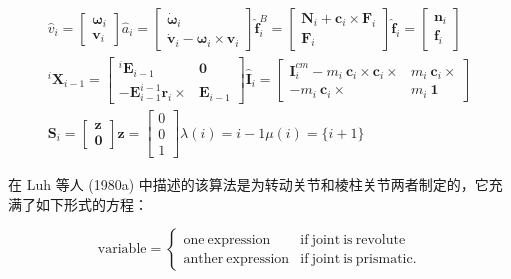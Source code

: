 \documentclass[10pt,a4paper]{book}
\theoremstyle{thmstyle} %
\theoremstyle{defstyle} %
\theoremstyle{prostyle} %
\begin{document}
$$
\begin{gathered}\hat{v}_i=\begin{bmatrix}\boldsymbol{\omega}_i\\\boldsymbol{v}_i\end{bmatrix}\hat{a}_i=\begin{bmatrix}\dot{\boldsymbol{\omega}}_i\\\dot{\boldsymbol{v}}_i-\boldsymbol{\omega}_i\times\boldsymbol{v}_i\end{bmatrix}\hat{\boldsymbol{f}}_i^B=\begin{bmatrix}\boldsymbol{N}_i+\boldsymbol{c}_i\times\boldsymbol{F}_i\\\boldsymbol{F}_i\end{bmatrix}\hat{\boldsymbol{f}}_i=\begin{bmatrix}\boldsymbol{n}_i\\\boldsymbol{f}_i\end{bmatrix}\\^i\boldsymbol{X}_{i-1}=\begin{bmatrix}{}^i\boldsymbol{E}_{i-1}&\mathbf{0}\\-\boldsymbol{E}_{i-1}^{i-1}\boldsymbol{r}_i\times&\boldsymbol{E}_{i-1}\end{bmatrix}\hat{\boldsymbol{I}}_i=\begin{bmatrix}\boldsymbol{I}_i^{cm}-m_i\:\boldsymbol{c}_i\times\boldsymbol{c}_i\times&m_i\:\boldsymbol{c}_i\times\\-m_i\:\boldsymbol{c}_i\times&m_i\:\boldsymbol{1}\end{bmatrix}\\\boldsymbol{S}_i=\begin{bmatrix}\boldsymbol{z}\\\boldsymbol{0}\end{bmatrix}\boldsymbol{z}=\begin{bmatrix}0\\0\\1\end{bmatrix}\lambda(i)=i-1\mu(i)=\{i+1\}\end{gathered}
$$



在 Luh 等人 (1980a) 中描述的该算法是为转动关节和棱柱关节两者制定的，它充满了如下形式的方程：



$$
{ \mathrm { v a r i a b l e } } = { \left\{ \begin{array}{ll} { { \mathrm { o n e ~ e x p r e s s i o n } } } & { { \mathrm { i f ~ j o i n t ~ i s ~ r e v o l u t e } } } \\{ { \mathrm { a n t h e r ~ e x p r e s s i o n } } } & { { \mathrm { i f ~ j o i n t ~ i s ~ p r i s m a t i c } } . } \end{array} \right. }
$$
\end{document}
